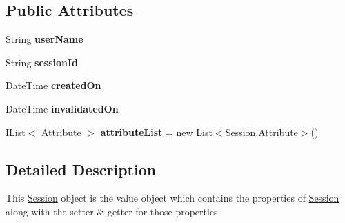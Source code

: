 \subsection*{Public Attributes}
\begin{DoxyCompactItemize}
\item 
\hypertarget{classcom_1_1shephertz_1_1app42_1_1paas_1_1sdk_1_1csharp_1_1session_1_1_session_a6a1544edf972c4c690d1d040c06e14e5}{String {\bfseries user\+Name}}\label{classcom_1_1shephertz_1_1app42_1_1paas_1_1sdk_1_1csharp_1_1session_1_1_session_a6a1544edf972c4c690d1d040c06e14e5}

\item 
\hypertarget{classcom_1_1shephertz_1_1app42_1_1paas_1_1sdk_1_1csharp_1_1session_1_1_session_a2ea2dd71ff91315e0f54df3b48c030a1}{String {\bfseries session\+Id}}\label{classcom_1_1shephertz_1_1app42_1_1paas_1_1sdk_1_1csharp_1_1session_1_1_session_a2ea2dd71ff91315e0f54df3b48c030a1}

\item 
\hypertarget{classcom_1_1shephertz_1_1app42_1_1paas_1_1sdk_1_1csharp_1_1session_1_1_session_abab5417bd609d7e7c995e1cf6cd39192}{Date\+Time {\bfseries created\+On}}\label{classcom_1_1shephertz_1_1app42_1_1paas_1_1sdk_1_1csharp_1_1session_1_1_session_abab5417bd609d7e7c995e1cf6cd39192}

\item 
\hypertarget{classcom_1_1shephertz_1_1app42_1_1paas_1_1sdk_1_1csharp_1_1session_1_1_session_ab58dc5846bd69834e1805e2505b361ad}{Date\+Time {\bfseries invalidated\+On}}\label{classcom_1_1shephertz_1_1app42_1_1paas_1_1sdk_1_1csharp_1_1session_1_1_session_ab58dc5846bd69834e1805e2505b361ad}

\item 
\hypertarget{classcom_1_1shephertz_1_1app42_1_1paas_1_1sdk_1_1csharp_1_1session_1_1_session_adaac3bc229cbac44c2e0a6a3438b667d}{I\+List$<$ \hyperlink{classcom_1_1shephertz_1_1app42_1_1paas_1_1sdk_1_1csharp_1_1session_1_1_session_1_1_attribute}{Attribute} $>$ {\bfseries attribute\+List} = new List$<$\hyperlink{classcom_1_1shephertz_1_1app42_1_1paas_1_1sdk_1_1csharp_1_1session_1_1_session_1_1_attribute}{Session.\+Attribute}$>$()}\label{classcom_1_1shephertz_1_1app42_1_1paas_1_1sdk_1_1csharp_1_1session_1_1_session_adaac3bc229cbac44c2e0a6a3438b667d}

\end{DoxyCompactItemize}


\subsection{Detailed Description}
This \hyperlink{classcom_1_1shephertz_1_1app42_1_1paas_1_1sdk_1_1csharp_1_1session_1_1_session}{Session} object is the value object which contains the properties of \hyperlink{classcom_1_1shephertz_1_1app42_1_1paas_1_1sdk_1_1csharp_1_1session_1_1_session}{Session} along with the setter \& getter for those properties. 



